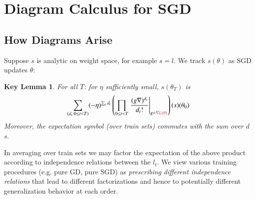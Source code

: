 \documentclass{article}
\theoremstyle{plain}
\newtheorem*{klem*}{Key Lemma}
\theoremstyle{definition}
\begin{document}

\section{Diagram Calculus for SGD} \label{sect:calculus}


    \subsection{How Diagrams Arise}

        Suppose $s$ is analytic on weight space, for example $s=l$.
        We track $s(\theta)$ as SGD updates $\theta$: %
        \begin{klem*} %
            For all $T$: for $\eta$ sufficiently small, $s(\theta_T)$ is
            \begin{equation}\label{eq:dyson}
                \sum_{(d_t: 0\leq t<T)}
                (-\eta)^{\sum_t d_t}
                \left(
                    \prod_{0 \leq t < T}
                        \left.
                            \frac{(g \nabla)^{d_t}}{d_t!}
                        \right|_{g={\color{moor}\nabla l_t(\theta)}}
                \right)
                (s) (\theta_0)
            \end{equation}
            Moreover, the expectation symbol (over train sets) commutes with
            the sum over $d$s.
        \end{klem*}
        In averaging over train sets we may factor the expectation of the above
        product according to independence relations between the $l_t$.  We view
        various training procedures (e.g. pure GD, pure SGD) as
        \emph{prescribing different independence relations} that lead to
        different factorizations and hence to potentially different
        generalization behavior at each order.
    
\end{document}
